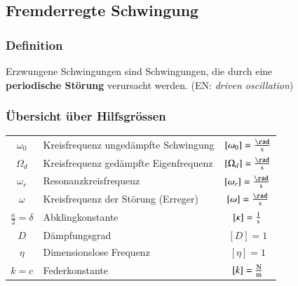 \subsection{Fremderregte Schwingung}

\subsubsection{Definition}

Erzwungene Schwingungen sind Schwingungen, die durch eine \\
\textbf{periodische Störung} verursacht werden. (EN: \textit{driven oscillation})

\subsubsection{Übersicht über Hilfsgrössen}


\begin{tabular}{c l c}
\rule{0pt}{10pt} $\omega_0$ & Kreisfrequenz ungedämpfte Schwingung & $[\omega_0] = \frac{\rad}{\s}$ \\
\rule{0pt}{10pt} $\Omega_d$ & Kreisfrequenz gedämpfte Eigenfrequenz & $[\Omega_d] = \frac{\rad}{\s}$ \\
\rule{0pt}{10pt} $\omega_r$ & Resonanzkreisfrequenz & $[\omega_r] = \frac{\rad}{\s}$ \\
\rule{0pt}{10pt} $\omega$ & Kreisfrequenz der Störung (Erreger) & $[\omega] = \frac{\rad}{\s}$ \\
\rule{0pt}{10pt} $\frac{\kappa}{2} = \delta $ & Abklingkonstante & $[\kappa] = \frac{1}{\mathrm{s}}$ \\
\rule{0pt}{10pt} $D$ & Dämpfungsgrad & $[D] = 1$ \\
$\eta$ & Dimensionslose Frequenz & $[\eta] = 1$  \\
$k = c$ & Federkonstante & $[k] = \frac{\mathrm{N}}{\mathrm{m}}$
\end{tabular}

